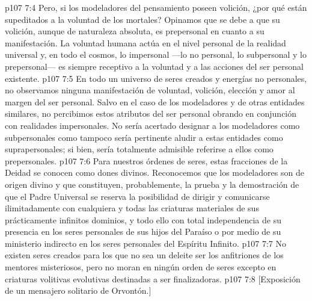 \vs p107 7:4 Pero, si los modeladores del pensamiento poseen volición, ¿por qué están supeditados a la voluntad de los mortales? Opinamos que se debe a que su volición, aunque de naturaleza absoluta, es prepersonal en cuanto a su manifestación. La voluntad humana actúa en el nivel personal de la realidad universal y, en todo el cosmos, lo impersonal ---lo no personal, lo subpersonal y lo prepersonal--- es siempre receptivo a la voluntad y a las acciones del ser personal existente.
\vs p107 7:5 En todo un universo de seres creados y energías no personales, no observamos ninguna manifestación de voluntad, volición, elección y amor al margen del ser personal. Salvo en el caso de los modeladores y de otras entidades similares, no percibimos estos atributos del ser personal obrando en conjunción con realidades impersonales. No sería acertado designar a los modeladores como subpersonales como tampoco sería pertinente aludir a estas entidades como suprapersonales; si bien, sería totalmente admisible referirse a ellos como prepersonales.
\vs p107 7:6 \pc Para nuestros órdenes de seres, estas fracciones de la Deidad se conocen como dones divinos. Reconocemos que los modeladores son de origen divino y que constituyen, probablemente, la prueba y la demostración de que el Padre Universal se reserva la posibilidad de dirigir y comunicarse ilimitadamente con cualquiera y todas las criaturas materiales de sus prácticamente infinitos dominios, y todo ello con total independencia de su presencia en los seres personales de sus hijos del Paraíso o por medio de su ministerio indirecto en los seres personales del Espíritu Infinito.
\vs p107 7:7 No existen seres creados para los que no sea un deleite ser los anfitriones de los mentores misteriosos, pero no moran en ningún orden de seres excepto en criaturas volitivas evolutivas destinadas a ser finalizadoras.
\vsetoff
\vs p107 7:8 [Exposición de un mensajero solitario de Orvontón.]
